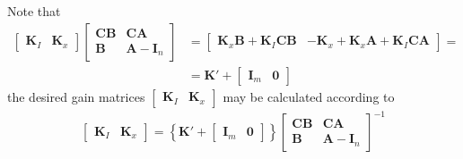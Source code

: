 \documentclass[11pt,a4paper,oneside]{book}
\numberwithin{equation}{section}
\theoremstyle{it}
\theoremstyle{definition}
\begin{document}
Note that
\begin{equation}
	\begin{aligned}
		\begin{bmatrix} 
			\mathbf{K}_I & \mathbf{K}_x
		\end{bmatrix}
		\begin{bmatrix} 
			\mathbf{C}\mathbf{B} & \mathbf{C}\mathbf{A} \\[6pt] 
			\mathbf{B} & \mathbf{A}-\mathbf{I}_n
		\end{bmatrix} &=
		\begin{bmatrix} 
			\mathbf{K}_x\mathbf{B} +\mathbf{K}_I\mathbf{C}\mathbf{B} & 
			-\mathbf{K}_x+\mathbf{K}_x\mathbf{A}+\mathbf{K}_I\mathbf{C}\mathbf{A}\end{bmatrix}
		= \\[6pt] 
		&=\mathbf{K'} + \begin{bmatrix} 
			\mathbf{I}_m & \mathbf{0}
		\end{bmatrix}
	\end{aligned}
\end{equation}
the desired gain matrices $		\begin{bmatrix} \mathbf{K}_I & \mathbf{K}_x \end{bmatrix}$ may be calculated according to
\begin{equation}
	\begin{aligned}
		\begin{bmatrix} 
			\mathbf{K}_I & \mathbf{K}_x
		\end{bmatrix} = \left\lbrace \mathbf{K'}+
		\begin{bmatrix} 
			\mathbf{I}_m & \mathbf{0}
		\end{bmatrix}\right\rbrace 
		\begin{bmatrix} 
			\mathbf{C}\mathbf{B} & \mathbf{C}\mathbf{A} \\[6pt] 
			\mathbf{B} & \mathbf{A}-\mathbf{I}_n
		\end{bmatrix}^{-1}
	\end{aligned}
\end{equation}
\end{document}
